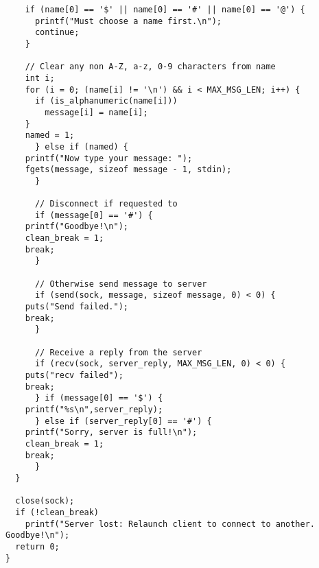 \documentclass[titlepage, 14pt]{article}
\begin{document}
\begin{verbatim}
	if (name[0] == '$' || name[0] == '#' || name[0] == '@') {
	  printf("Must choose a name first.\n");
	  continue;
	}
	
	// Clear any non A-Z, a-z, 0-9 characters from name
	int i;
	for (i = 0; (name[i] != '\n') && i < MAX_MSG_LEN; i++) {
	  if (is_alphanumeric(name[i]))
	    message[i] = name[i];	      	    
	}
	named = 1;
      } else if (named) {	
	printf("Now type your message: ");
	fgets(message, sizeof message - 1, stdin);
      }

      // Disconnect if requested to
      if (message[0] == '#') {
	printf("Goodbye!\n");
	clean_break = 1;
	break;
      }
      
      // Otherwise send message to server
      if (send(sock, message, sizeof message, 0) < 0) {
	puts("Send failed.");
	break;
      } 
      
      // Receive a reply from the server
      if (recv(sock, server_reply, MAX_MSG_LEN, 0) < 0) {
	puts("recv failed");
	break;
      } if (message[0] == '$') {
	printf("%s\n",server_reply);	 
      } else if (server_reply[0] == '#') {
	printf("Sorry, server is full!\n");
	clean_break = 1;
	break;
      }
  }
  
  close(sock);
  if (!clean_break)
    printf("Server lost: Relaunch client to connect to another. Goodbye!\n");
  return 0;
}
\end{verbatim}
\end{document}
